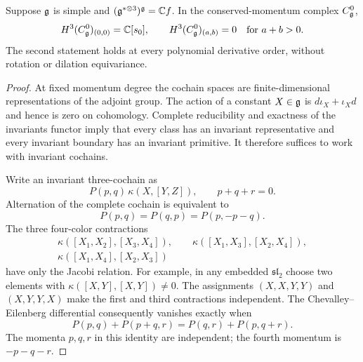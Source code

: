 \begin{lemma}
\label{lem:f-channel-all-degrees}
Suppose $\mathfrak g$ is simple and $(\mathfrak g^{*\otimes3})^{\mathfrak g}=\mathbb C f$.
In the conserved-momentum complex $C^0_{\mathfrak g}$,
\begin{equation}
H^3(C^0_{\mathfrak g})_{(0,0)}=\mathbb C[s_0],\qquad
H^3(C^0_{\mathfrak g})_{(a,b)}=0\quad\text{for }a+b>0.
\label{eq:f-channel-H3}
\end{equation}
The second statement holds at every polynomial derivative order, without
rotation or dilation equivariance.
\end{lemma}

\begin{proof}
At fixed momentum degree the cochain spaces are finite-dimensional
representations of the adjoint group.  The action of a constant
$X\in\mathfrak g$ is $d\iota_X+\iota_Xd$ and hence is zero on cohomology.
Complete reducibility and exactness of the invariants functor imply that
every class has an invariant representative and every invariant boundary
has an invariant primitive.  It therefore suffices to work with invariant
cochains.

Write an invariant three-cochain as
\begin{equation}
P(p,q)\,\kappa(X,[Y,Z]),\qquad p+q+r=0.
\end{equation}
Alternation of the complete cochain is equivalent to
\begin{equation}
P(p,q)=P(q,p)=P(p,-p-q).
\label{eq:P-permutations}
\end{equation}
The three four-color contractions
\[
\begin{gathered}
\kappa([X_1,X_2],[X_3,X_4]),\qquad
\kappa([X_1,X_3],[X_2,X_4]),\\
\kappa([X_1,X_4],[X_2,X_3])
\end{gathered}
\]
have only the Jacobi relation.
For example, in any embedded $\mathfrak{sl}_2$ choose two elements with
$\kappa([X,Y],[X,Y])\ne0$.  The assignments $(X,X,Y,Y)$ and
$(X,Y,Y,X)$ make the first and third contractions independent.
The Chevalley--Eilenberg differential consequently vanishes exactly when
\begin{equation}
P(p,q)+P(p+q,r)=P(q,r)+P(p,q+r).
\label{eq:P-cocycle}
\end{equation}
The momenta $p,q,r$ in this identity are independent; the fourth momentum
is $-p-q-r$.


\end{proof}
